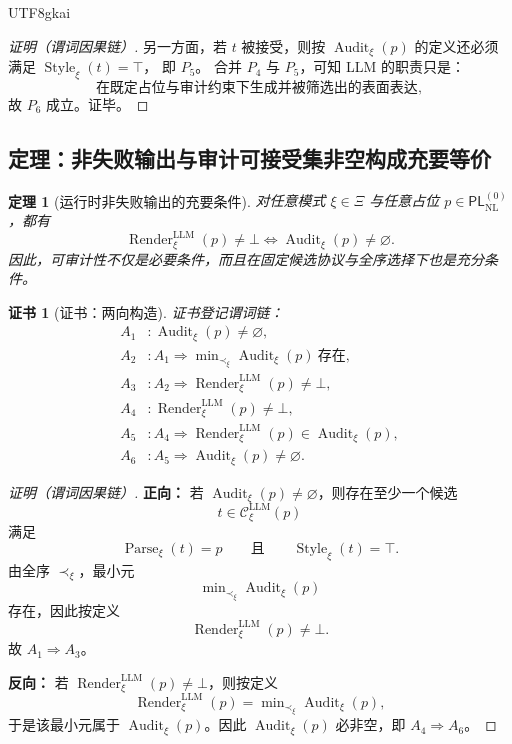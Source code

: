 \documentclass[12pt]{article}
\newtheorem{theorem}{定理}[section]
\newtheorem{Certificate}{证书}[section]
\newcommand{\Parse}{\operatorname{Parse}}
\newcommand{\Audit}{\operatorname{Audit}}
\newcommand{\Render}{\operatorname{Render}}
\newcommand{\Style}{\operatorname{Style}}
\begin{document}
\begin{CJK*}{UTF8}{gkai}
\begin{proof}[证明（谓词因果链）]
另一方面，若 $t$ 被接受，则按 $\Audit_\xi(p)$ 的定义还必须满足 $\Style_\xi(t)=\top$，
即 $P_5$。
合并 $P_4$ 与 $P_5$，可知 LLM 的职责只是：
\[
  \text{在既定占位与审计约束下生成并被筛选出的表面表达},
\]
故 $P_6$ 成立。证毕。
\end{proof}

\subsection{定理：非失败输出与审计可接受集非空构成充要等价}
\label{subsec:tex37-ch3-iff}

\begin{theorem}[运行时非失败输出的充要条件]
\label{thm:tex37-ch3-render-iff-audit}
对任意模式 $\xi\in\Xi$ 与任意占位 $p\in\mathsf{PL}_{\mathrm{NL}}^{(0)}$，都有
\[
  \boxed{
    \Render^{\mathrm{LLM}}_\xi(p)\neq\bot
    \iff
    \Audit_\xi(p)\neq\varnothing
  }.
\]
因此，可审计性不仅是必要条件，而且在固定候选协议与全序选择下也是充分条件。
\end{theorem}

\begin{Certificate}[证书：两向构造]
\label{cert:tex37-ch3-render-iff-audit}
证书登记谓词链：
\[
\begin{aligned}
  A_1 &: \Audit_\xi(p)\neq\varnothing,\\
  A_2 &: A_1\Rightarrow \min\nolimits_{\prec_\xi}\Audit_\xi(p)\ \text{存在},\\
  A_3 &: A_2\Rightarrow \Render^{\mathrm{LLM}}_\xi(p)\neq\bot,\\
  A_4 &: \Render^{\mathrm{LLM}}_\xi(p)\neq\bot,\\
  A_5 &: A_4\Rightarrow \Render^{\mathrm{LLM}}_\xi(p)\in \Audit_\xi(p),\\
  A_6 &: A_5\Rightarrow \Audit_\xi(p)\neq\varnothing.
\end{aligned}
\]
\end{Certificate}

\begin{proof}[证明（谓词因果链）]
\textbf{正向：}
若 $\Audit_\xi(p)\neq\varnothing$，则存在至少一个候选
\[
  t\in\mathcal{C}^{\mathrm{LLM}}_\xi(p)
\]
满足
\[
  \Parse_\xi(t)=p
  \qquad\text{且}\qquad
  \Style_\xi(t)=\top.
\]
由全序 $\prec_\xi$，最小元
\[
  \min\nolimits_{\prec_\xi}\Audit_\xi(p)
\]
存在，因此按定义
\[
  \Render^{\mathrm{LLM}}_\xi(p)\neq\bot.
\]
故 $A_1\Rightarrow A_3$。

\textbf{反向：}
若 $\Render^{\mathrm{LLM}}_\xi(p)\neq\bot$，则按定义
\[
  \Render^{\mathrm{LLM}}_\xi(p)=\min\nolimits_{\prec_\xi}\Audit_\xi(p),
\]
于是该最小元属于 $\Audit_\xi(p)$。因此 $\Audit_\xi(p)$ 必非空，即 $A_4\Rightarrow A_6$。


\end{proof}
\end{CJK*}
\end{document}
